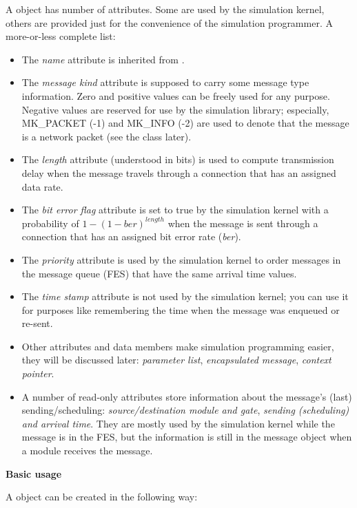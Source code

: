 A  object has number of attributes. Some are used by
the simulation kernel, others are provided just for the convenience
of the simulation programmer. A more-or-less complete list:
\begin{itemize}
  \item{The \textit{name} attribute is inherited from .}
  \item{The \textit{message kind} attribute is supposed to carry some message
    type information. Zero and positive values can be freely used
    for any purpose. Negative values are reserved for use by the
    {\opp} simulation library; especially, MK\_PACKET (-1) and MK\_INFO
    (-2) are used to denote that the message is a network packet
    (see the  class later).}
  \item{The \textit{length} attribute (understood in bits) is used to compute
    transmission delay when the message travels through a connection
    that has an assigned data rate.}
  \item{The \textit{bit error flag} attribute is set to true by the simulation
    kernel with a probability of $1-(1-\textit{ber})^{\mathit{length}}$ when the
    message is sent through a connection that has an assigned bit
    error rate (\textit{ber}).}
  \item{The \textit{priority} attribute is used by the simulation kernel to
    order messages in the message queue (FES) that have the same
    arrival time values.}
  \item{The \textit{time stamp} attribute is not used by the simulation kernel;
    you can use it for purposes like remembering the time when the
    message was enqueued or re-sent.}
  \item{Other attributes and data members make simulation programming
    easier, they will be discussed later: \textit{parameter list}, \textit{encapsulated
      message}, \textit{context pointer}.}
  \item{A number of read-only attributes store information about the
    message's (last) sending/scheduling: \textit{source/destination module
      and gate}, \textit{sending (scheduling) and arrival time}. They are
    mostly used by the simulation kernel while the message is in
    the FES, but the information is still in the message object when
    a module receives the message.}
\end{itemize}


\textbf{Basic usage}


A  object can be created in the following way:

